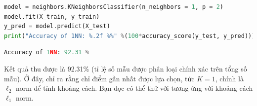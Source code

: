 \begin{lstlisting}[language=Python]
model = neighbors.KNeighborsClassifier(n_neighbors = 1, p = 2)
model.fit(X_train, y_train)
y_pred = model.predict(X_test)
print("Accuracy of 1NN: %.2f %%" %(100*accuracy_score(y_test, y_pred)))
\end{lstlisting}
\kq
\begin{lstlisting}[language=Python]
Accuracy of 1NN: 92.31 %
\end{lstlisting}

Kết quả thu được là 92.31\% (tỉ lệ số mẫu được phân loại chính xác trên tổng số
mẫu). Ở đây,  chỉ ra rằng chỉ điểm gần nhất được
lựa chọn, tức $K = 1$,  chính là $\ell_2$ norm để tính
khoảng cách. Bạn đọc có thể thử với  tương ứng với khoảng
cách $\ell_1$ norm.














